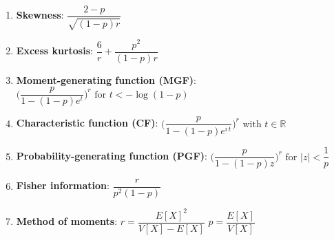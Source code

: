 \begin{enumerate}
    \item \textbf{Skewness}:
    $
         {\displaystyle {\dfrac {2-p}{\sqrt {(1-p)r}}}}
    $
    \hfill \cite{wiki/Negative_binomial_distribution}

    \item \textbf{Excess kurtosis}:
    $
         {\displaystyle {\dfrac {6}{r}}+{\dfrac {p^{2}}{(1-p)r}}}
    $
    \hfill \cite{wiki/Negative_binomial_distribution}


    \item \textbf{Moment-generating function (MGF)}:
    $
         {\displaystyle {\biggl (}{\dfrac {p}{1-(1-p)e^{t}}}{\biggr )}^{\!r}{\text{ for }}t<-\log(1-p)}
    $
    \hfill \cite{wiki/Negative_binomial_distribution}

    \item \textbf{Characteristic function (CF)}:
    $
         {\displaystyle {\biggl (}{\dfrac {p}{1-(1-p)e^{i\,t}}}{\biggr )}^{\!r}{\text{ with }}t\in \mathbb {R} }
    $
    \hfill \cite{wiki/Negative_binomial_distribution}

    \item \textbf{Probability-generating function (PGF)}:
    $
         {\displaystyle {\biggl (}{\dfrac {p}{1-(1-p)z}}{\biggr )}^{\!r}{\text{ for }}|z|<{\dfrac {1}{p}}}
    $
    \hfill \cite{wiki/Negative_binomial_distribution}

    \item \textbf{Fisher information}:
    $
         {\displaystyle {\dfrac {r}{p^{2}(1-p)}}}
    $
    \hfill \cite{wiki/Negative_binomial_distribution}

    \item \textbf{Method of moments}:
    $ {\displaystyle r={\dfrac {E[X]^{2}}{V[X]-E[X]}}}$
    \hspace{1cm}
    $ {\displaystyle p={\dfrac {E[X]}{V[X]}}}$
    \hfill \cite{wiki/Negative_binomial_distribution}
\end{enumerate}







